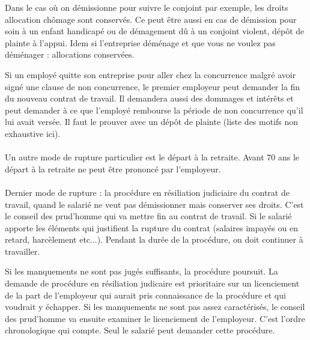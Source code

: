 Dans le cas où on démissionne pour suivre le conjoint par exemple, les droits allocation chômage sont conservés.
Ce peut être aussi en cas de démission pour soin à un enfant handicapé ou de démagement dû à un conjoint violent, dépôt de plainte à l'appui.
Idem si l’entreprise déménage et que vous ne voulez pas déménager : allocations conservées.

Si un employé quitte son entreprise pour aller chez la concurrence malgré avoir signé une clause de non concurrence, le premier employeur peut demander la fin du nouveau contrat de travail.
Il demandera aussi des dommages et intérêts et peut demander à ce que l’employé rembourse la période de non concurrence qu’il lui avait versée.
Il faut le prouver avec un dépôt de plainte (liste des motifs non exhaustive ici).

\paragraph{}
Un autre mode de rupture particulier est le départ à la retraite.
Avant 70 ans le départ à la retraite ne peut être prononcé par l’employeur. 

\paragraph{}
Dernier mode de rupture : la procédure en résiliation judiciaire du contrat de travail, quand le salarié ne veut pas démissionner mais conserver ses droits.
C’est le conseil des prud’homme qui va mettre fin au contrat de travail. Si le salarié apporte les éléments qui justifient la rupture du contrat (salaires impayés ou en retard, harcèlement etc...).
Pendant la durée de la procédure, on doit continuer à travailler.

Si les manquements ne sont pas jugés suffisants, la procédure poursuit.
La demande de procédure en résiliation judicaire est prioritaire sur un licenciement de la part de l’employeur qui aurait pris connaissance de la procédure et qui voudrait y échapper.
Si les manquements ne sont pas assez caractérisés, le conseil des prud’homme va ensuite examiner le licenciement de l’employeur.
C’est l’ordre chronologique qui compte.
Seul le salarié peut demander cette procédure.